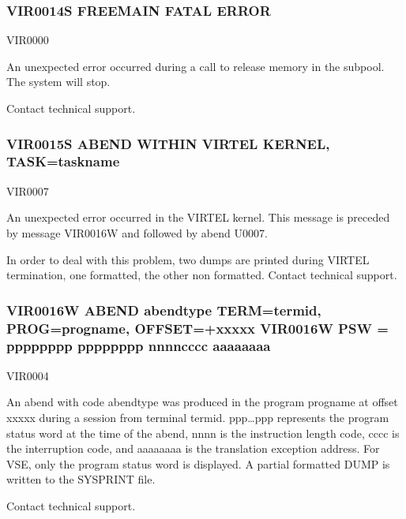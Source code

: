 \documentclass[letterpaper,10pt,english]{sphinxmanual}
\begin{document}
\subsubsection{VIR0014S FREEMAIN FATAL ERROR}
\label{\detokenize{messages:vir0014s-freemain-fatal-error}}\begin{description}
\sphinxAtStartPar
VIR0000

\sphinxAtStartPar
An unexpected error occurred during a call to release memory in the subpool. The system will stop.

\sphinxAtStartPar
Contact technical support.

\end{description}


\subsubsection{VIR0015S ABEND WITHIN VIRTEL KERNEL, TASK=taskname}
\label{\detokenize{messages:vir0015s-abend-within-virtel-kernel-task-taskname}}\begin{description}
\sphinxAtStartPar
VIR0007

\sphinxAtStartPar
An unexpected error occurred in the VIRTEL kernel. This message is preceded by message VIR0016W and followed by abend U0007.

\sphinxAtStartPar
In order to deal with this problem, two dumps are printed during VIRTEL termination, one formatted, the other non formatted. Contact technical support.

\end{description}


\subsubsection{VIR0016W ABEND abendtype TERM=termid, PROG=progname, OFFSET=+xxxxx VIR0016W PSW = pppppppp pppppppp nnnncccc aaaaaaaa}
\label{\detokenize{messages:vir0016w-abend-abendtype-term-termid-prog-progname-offset-xxxxx-vir0016w-psw-pppppppp-pppppppp-nnnncccc-aaaaaaaa}}\begin{description}
\sphinxAtStartPar
VIR0004

\sphinxAtStartPar
An abend with code abendtype was produced in the program progname at offset xxxxx during a session from terminal termid. ppp…ppp represents the program status word at the time of the abend, nnnn is the instruction length code, cccc is the interruption code, and aaaaaaaa is the translation exception address. For VSE, only the program status word is displayed. A partial formatted DUMP is written to the SYSPRINT file.

\sphinxAtStartPar
Contact technical support.

\end{description}
\end{document}

